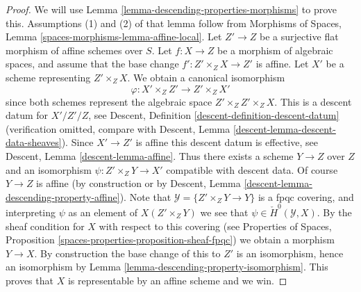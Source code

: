 \documentclass[10pt,a4paper]{amsart}
\theoremstyle{plain}
\theoremstyle{definition}
\theoremstyle{remark}
\numberwithin{equation}{subsection}
\begin{document}
\begin{proof}
We will use
Lemma \ref{lemma-descending-properties-morphisms}
to prove this. Assumptions (1) and (2) of that lemma follow from
Morphisms of Spaces,
Lemma \ref{spaces-morphisms-lemma-affine-local}.
Let $Z' \to Z$ be a surjective flat morphism of affine schemes over $S$.
Let $f : X \to Z$ be a morphism of algebraic spaces, and assume
that the base change $f' : Z' \times_Z X \to Z'$ is affine.
Let $X'$ be a scheme representing $Z' \times_Z X$.
We obtain a canonical isomorphism
$$
\varphi : X' \times_Z Z' \longrightarrow Z' \times_Z X'
$$
since both schemes represent the algebraic space $Z' \times_Z Z' \times_Z X$.
This is a descent datum for $X'/Z'/Z$, see
Descent, Definition \ref{descent-definition-descent-datum}
(verification omitted, compare with
Descent, Lemma \ref{descent-lemma-descent-data-sheaves}).
Since $X' \to Z'$ is affine this descent datum is effective, see
Descent, Lemma \ref{descent-lemma-affine}.
Thus there exists a scheme $Y \to Z$ over $Z$ and an
isomorphism $\psi : Z' \times_Z Y \to X'$ compatible with descent data.
Of course $Y \to Z$ is affine (by construction or by
Descent, Lemma \ref{descent-lemma-descending-property-affine}).
Note that $\mathcal{Y} = \{Z' \times_Z Y \to Y\}$ is a
fpqc covering, and interpreting $\psi$ as an element of
$X(Z' \times_Z Y)$ we see that $\psi \in \check{H}^0(\mathcal{Y}, X)$.
By the sheaf condition for $X$ with respect to this covering (see
Properties of Spaces, Proposition
\ref{spaces-properties-proposition-sheaf-fpqc})
we obtain a morphism $Y \to X$.
By construction the base change of this to $Z'$ is an isomorphism, hence
an isomorphism by
Lemma \ref{lemma-descending-property-isomorphism}.
This proves that $X$ is representable by an affine scheme and we win.
\end{proof}
\end{document}
